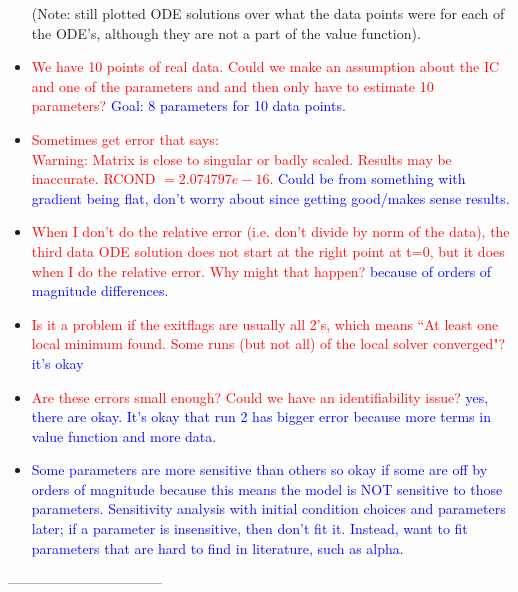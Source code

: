 \documentclass[12pt]{article}
\begin{document}
\begin{itemize}
(Note: still plotted ODE solutions over what the data points were for each of the ODE's, although they are not a part of the value function). 

\item \textcolor{red}{We have 10 points of real data. Could we make an assumption about the IC and one of the parameters and and then only have to estimate 10 parameters?} \textcolor{blue}{Goal: 8 parameters for 10 data points.}


\item \textcolor{red}{Sometimes get error that says: \\
Warning: Matrix is close to singular or badly scaled. Results may be inaccurate. RCOND $=
2.074797e-16.$} \textcolor{blue}{Could be from something with gradient being flat, don't worry about since getting good/makes sense results.}

\item \textcolor{red}{When I don't do the relative error (i.e. don't divide by norm of the data), the third data ODE solution does not start at the right point at t=0, but it does when I do the relative error. Why might that happen?} \textcolor{blue}{because of orders of magnitude differences.}

\item \textcolor{red}{Is it a problem if the exitflags are usually all 2's, which means ``At least one local minimum found. Some runs (but not all) of the local solver converged"?} \textcolor{blue}{it's okay}

\item \textcolor{red}{Are these errors small enough? Could we have an identifiability issue?} \textcolor{blue}{yes, there are okay. It's okay that run 2 has bigger error because more terms in value function and more data.}

\item \textcolor{blue}{Some parameters are more sensitive than others so okay if some are off by orders of magnitude because this means the model is NOT sensitive to those parameters. Sensitivity analysis with initial condition choices and parameters later; if a parameter is insensitive, then don't fit it. Instead, want to fit parameters that are hard to find in literature, such as alpha.}

\end{itemize}
---------------------------------
\pagebreak
\end{document}
